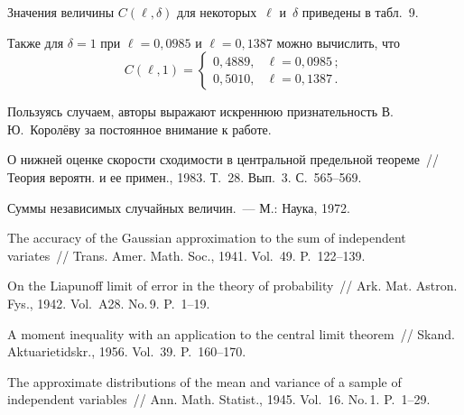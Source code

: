 \begin{multicols}{2}

Значения величины $C(\ell,\delta)$ для некоторых~$\ell$ и~$\delta$
приведены в табл.~9.


Также для $\delta=1$ при $\ell=0{,}0985$ и $\ell=0{,}1387$ можно вычислить, что
$$
C(\ell,1)= \begin{cases}
0{,}4889,&\ell=0{,}0985\,;\\
0{,}5010,&\ell=0{,}1387\,.
\end{cases}
$$

\bigskip

Пользуясь случаем, авторы выражают искреннюю признательность
В.\,Ю.~Королёву за постоянное внимание к работе.

{\small\frenchspacing
{%
\begin{thebibliography}{99}

 О нижней оценке скорости сходимости в
центральной предельной теореме~// Теория вероятн. и ее примен.,
1983. Т.~28. Вып.~3. С.~565--569.

 Суммы независимых случайных величин.~--- М.:
Наука, 1972.

 The accuracy of the Gaussian approximation to the
sum of independent variates~// Trans. Amer. Math. Soc., 1941.
Vol.~49. P.~122--139.

 On the Liapunoff limit of error in the theory of
probability~// Ark. Mat. Astron. Fys., 1942. Vol.~A28. No.\,9.
P.~1--19.

 A moment inequality with an application to the
central limit theorem~// Skand. Aktuarietidskr., 1956. Vol.~39. P.~160--170.

 The approximate distributions of the mean and
variance of a sample of independent variables~// Ann. Math.
Statist., 1945. Vol.~16. No.\,1. P.~1--29.


\end{thebibliography}}}
\end{multicols}
